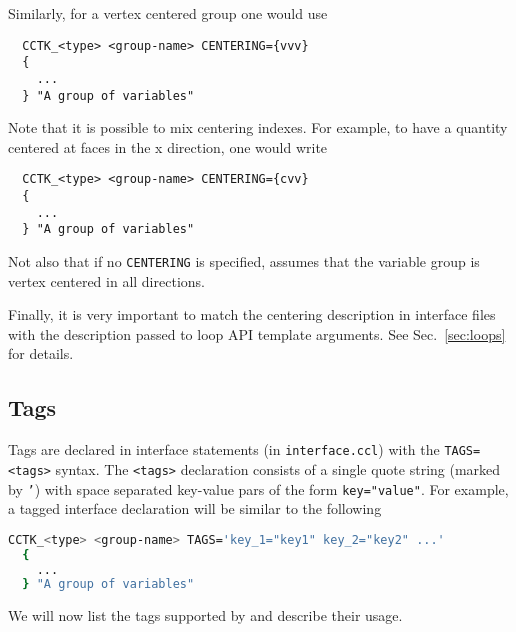 Similarly, for a vertex centered group one would use
%
\begin{lstlisting}
  CCTK_<type> <group-name> CENTERING={vvv}
  {
    ...
  } "A group of variables"
\end{lstlisting}

Note that it is possible to mix centering indexes. For example, to have a quantity centered at faces in the x direction, one would write
%
\begin{lstlisting}
  CCTK_<type> <group-name> CENTERING={cvv}
  {
    ...
  } "A group of variables"
\end{lstlisting}

Not also that if no \texttt{CENTERING} is specified, \CarpetX\space assumes that the variable group is vertex centered in all directions.

Finally, it is very important to match the centering description in interface files with the description passed to loop API template arguments. See Sec.~\ref{sec:loops} for details.

\subsection{Tags}
\label{sec:tags}

Tags are declared in interface statements (in \texttt{interface.ccl}) with the \texttt{TAGS=<tags>} syntax. The \texttt{<tags>} declaration consists of a single quote string (marked by \texttt{'}) with space separated key-value pars of the form \texttt{key="value"}. For example, a tagged interface declaration will be similar to the following
%
\begin{lstlisting}[language=bash]
  CCTK_<type> <group-name> TAGS='key_1="key1" key_2="key2" ...'
  {
    ...
  } "A group of variables"
\end{lstlisting}

We will now list the tags supported by \CarpetX\space and describe their usage.

